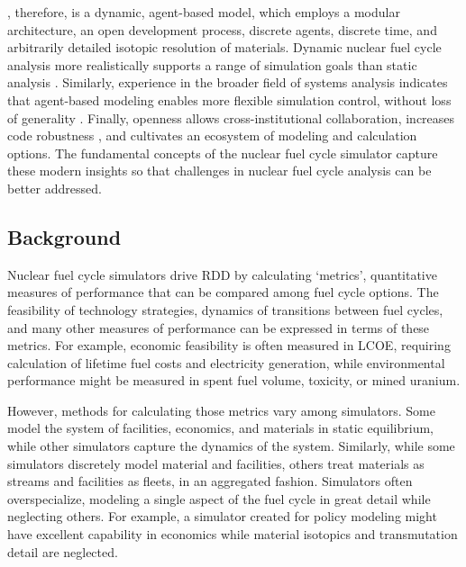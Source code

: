 \Cyclus, therefore, is a dynamic, agent-based model, which employs a modular 
architecture, an open development process, discrete agents, discrete time, and 
arbitrarily detailed isotopic resolution of materials.  Dynamic nuclear fuel 
cycle analysis more realistically supports a range of simulation goals than 
static analysis 
\cite{piet_dynamic_2011}. Similarly, experience in the broader field of systems 
analysis indicates that agent-based modeling enables more flexible simulation 
control, without loss of generality \cite{macal_agent-based_2010}. Finally, openness 
allows cross-institutional collaboration, increases code robustness \cite{cohen_modern_2010}, and 
cultivates an ecosystem of modeling and calculation options.  The fundamental concepts of the \Cyclus 
nuclear fuel cycle simulator capture these modern insights so that challenges 
in nuclear fuel cycle analysis can be better addressed. 

\subsection{Background}



Nuclear fuel cycle simulators drive \gls{RDD} by calculating `metrics', 
quantitative measures of performance that 
can be compared among fuel cycle options. The feasibility of technology 
strategies, dynamics of transitions between fuel cycles, and many other 
measures of performance can be expressed in terms of these metrics. For example, 
economic feasibility is often measured in \gls{LCOE}, requiring calculation of
lifetime fuel costs and electricity generation, 
while environmental performance might be measured in spent fuel volume, 
  toxicity, or mined uranium.

However, methods for calculating those metrics vary among simulators. Some model the 
system of facilities, economics, and materials in static equilibrium, while 
other simulators capture the dynamics of the system.  
Similarly, while some simulators discretely model material and facilities, 
others treat materials as streams and facilities as fleets, in an aggregated 
fashion. Simulators often overspecialize, 
modeling a single aspect of the fuel cycle in great detail while neglecting 
others. For example, a simulator created for policy modeling might have excellent 
capability in economics while material isotopics and transmutation detail are 
neglected.

